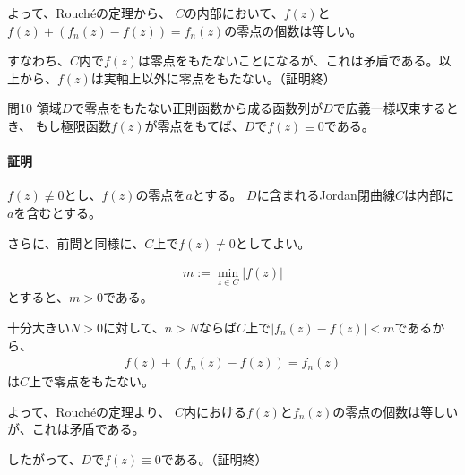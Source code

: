 よって、Rouch\'{e}の定理から、
$C$の内部において、$f(z)$と\\
$f(z)+(f_n(z)-f(z))=f_n(z)$の零点の個数は等しい。

すなわち、$C$内で$f(z)$は零点をもたないことになるが、これは矛盾である。以上から、$f(z)$は実軸上以外に零点をもたない。（証明終）

\newpage
\begin{mysimplebox}{問10}
    領域$D$で零点をもたない正則函数から成る函数列が$D$で広義一様収束するとき、
    もし極限函数$f(z)$が零点をもてば、$D$で$f(z)\equiv0$である。
\end{mysimplebox}
\paragraph{証明}
$f(z)\not\equiv0$とし、$f(z)$の零点を$a$とする。
$D$に含まれるJordan閉曲線$C$は内部に$a$を含むとする。

さらに、前問と同様に、$C$上で$f(z)\neq0$としてよい。

\begin{align*}
    m:=\min_{z\in C}|f(z)|
\end{align*}
とすると、$m>0$である。

十分大きい$N>0$に対して、$n>N$ならば$C$上で$|f_n(z)-f(z)|<m$であるから、
\begin{align*}
    f(z)+(f_n(z)-f(z))=f_n(z)
\end{align*}
は$C$上で零点をもたない。

よって、Rouch\'{e}の定理より、
$C$内における$f(z)$と$f_n(z)$の零点の個数は等しいが、これは矛盾である。

したがって、$D$で$f(z)\equiv0$である。（証明終）